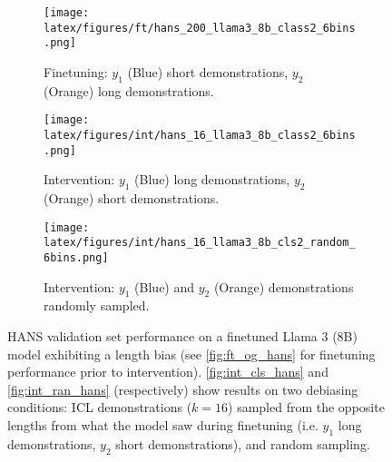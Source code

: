 \begin{figure*}[t!]
    \centering
    \begin{minipage}[t]{\linewidth}
        \begin{subfigure}{0.31\linewidth}
            \centering
            \texttt{[image: latex/figures/ft/hans\_200\_llama3\_8b\_class2\_6bins.png]}
            \caption{Finetuning: $y_1$ (Blue) short demonstrations, $y_2$ (Orange) long demonstrations.}\label{fig:ft_og_hans}
        \end{subfigure}%
        \hfill
        \begin{subfigure}{0.31\linewidth}
            \centering
            \texttt{[image: latex/figures/int/hans\_16\_llama3\_8b\_class2\_6bins.png]}
            \caption{Intervention: $y_1$ (Blue) long demonstrations, $y_2$ (Orange) short demonstrations.}\label{fig:int_cls_hans}
        \end{subfigure}
        \hfill
        \begin{subfigure}{0.31\linewidth}
            \centering
            \texttt{[image: latex/figures/int/hans\_16\_llama3\_8b\_cls2\_random\_6bins.png]}
            \caption{Intervention: $y_1$ (Blue) and $y_2$ (Orange) demonstrations randomly sampled.}\label{fig:int_ran_hans}
        \end{subfigure}
    \end{minipage}%
    \hfill
    \begin{minipage}[c]{\linewidth}
        \caption{\label{fig:int-hans} HANS validation set performance on a finetuned Llama 3 (8B) model exhibiting a length bias (see \autoref{fig:ft_og_hans} for finetuning performance prior to intervention). \autoref{fig:int_cls_hans} and \autoref{fig:int_ran_hans} (respectively) show results on two debiasing conditions: ICL demonstrations ($k=16$) sampled from the opposite lengths from what the model saw during finetuning (i.e. $y_1$ long demonstrations, $y_2$ short demonstrations), and random sampling.}
    \end{minipage}
\end{figure*}